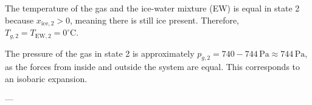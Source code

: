 The temperature of the gas and the ice-water mixture (EW) is equal in state 2 because \( x_{\text{ice},2} > 0 \), meaning there is still ice present. Therefore, \( T_{g,2} = T_{\text{EW},2} = 0^\circ\text{C} \).

The pressure of the gas in state 2 is approximately \( p_{g,2} = 740 - 744 \, \text{Pa} \approx 744 \, \text{Pa} \), as the forces from inside and outside the system are equal. This corresponds to an isobaric expansion.

---